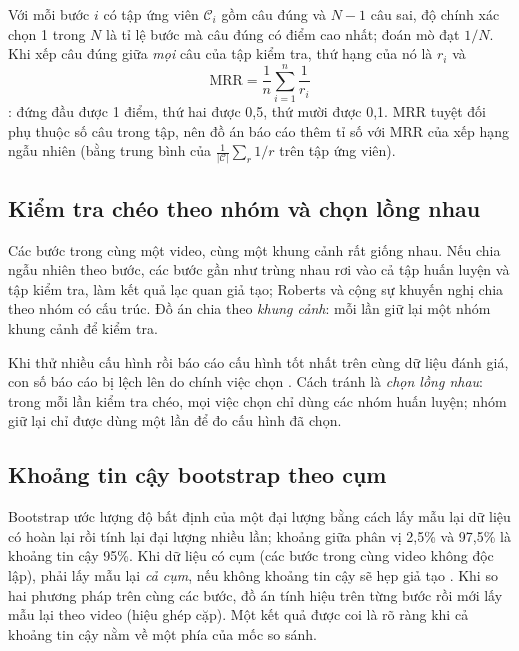 \documentclass[a4paper,oneside]{report}
\newcommand{\MRR}{\mathrm{MRR}}
\begin{document}
Với mỗi bước $i$ có tập ứng viên $\mathcal{C}_i$ gồm câu đúng và $N-1$ câu sai, độ chính xác chọn 1 trong $N$ là tỉ lệ bước mà câu đúng có điểm cao nhất; đoán mò đạt $1/N$. Khi xếp câu đúng giữa \textit{mọi} câu của tập kiểm tra, thứ hạng của nó là $r_i$ và
\begin{equation}
  \MRR = \frac{1}{n}\sum_{i=1}^{n}\frac{1}{r_i}
  \label{eq:mrr}
\end{equation}
\citep{voorhees1999trec}: đứng đầu được 1 điểm, thứ hai được 0,5, thứ mười được 0,1. MRR tuyệt đối phụ thuộc số câu trong tập, nên đồ án báo cáo thêm tỉ số với MRR của xếp hạng ngẫu nhiên (bằng trung bình của $\frac{1}{|\mathcal{C}|}\sum_{r}1/r$ trên tập ứng viên).

\subsection{Kiểm tra chéo theo nhóm và chọn lồng nhau}

Các bước trong cùng một video, cùng một khung cảnh rất giống nhau. Nếu chia ngẫu nhiên theo bước, các bước gần như trùng nhau rơi vào cả tập huấn luyện và tập kiểm tra, làm kết quả lạc quan giả tạo; Roberts và cộng sự \citep{roberts2017cv} khuyến nghị chia theo nhóm có cấu trúc. Đồ án chia theo \textit{khung cảnh}: mỗi lần giữ lại một nhóm khung cảnh để kiểm tra.

Khi thử nhiều cấu hình rồi báo cáo cấu hình tốt nhất trên cùng dữ liệu đánh giá, con số báo cáo bị lệch lên do chính việc chọn \citep{cawley2010overfitting}. Cách tránh là \textit{chọn lồng nhau}: trong mỗi lần kiểm tra chéo, mọi việc chọn chỉ dùng các nhóm huấn luyện; nhóm giữ lại chỉ được dùng một lần để đo cấu hình đã chọn.

\subsection{Khoảng tin cậy bootstrap theo cụm}

Bootstrap \citep{efron1993bootstrap} ước lượng độ bất định của một đại lượng bằng cách lấy mẫu lại dữ liệu có hoàn lại rồi tính lại đại lượng nhiều lần; khoảng giữa phân vị 2,5\% và 97,5\% là khoảng tin cậy 95\%. Khi dữ liệu có cụm (các bước trong cùng video không độc lập), phải lấy mẫu lại \textit{cả cụm}, nếu không khoảng tin cậy sẽ hẹp giả tạo \citep{field2007bootstrap}. Khi so hai phương pháp trên cùng các bước, đồ án tính hiệu trên từng bước rồi mới lấy mẫu lại theo video (hiệu ghép cặp). Một kết quả được coi là rõ ràng khi cả khoảng tin cậy nằm về một phía của mốc so sánh.
\end{document}
